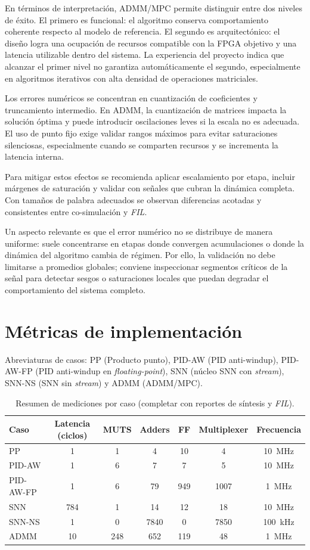 En términos de interpretación, ADMM/MPC permite distinguir entre dos niveles de éxito. El primero es funcional: el algoritmo conserva comportamiento coherente respecto al modelo de referencia. El segundo es arquitectónico: el diseño logra una ocupación de recursos compatible con la FPGA objetivo y una latencia utilizable dentro del sistema. La experiencia del proyecto indica que alcanzar el primer nivel no garantiza automáticamente el segundo, especialmente en algoritmos iterativos con alta densidad de operaciones matriciales.

Los errores numéricos se concentran en cuantización de coeficientes y truncamiento intermedio. En ADMM, la cuantización de matrices impacta la solución óptima y puede introducir oscilaciones leves si la escala no es adecuada. El uso de punto fijo exige validar rangos máximos para evitar saturaciones silenciosas, especialmente cuando se comparten recursos y se incrementa la latencia interna.

Para mitigar estos efectos se recomienda aplicar escalamiento por etapa, incluir márgenes de saturación y validar con señales que cubran la dinámica completa. Con tamaños de palabra adecuados se observan diferencias acotadas y consistentes entre co-simulación y \textit{FIL}.

Un aspecto relevante es que el error numérico no se distribuye de manera uniforme: suele concentrarse en etapas donde convergen acumulaciones o donde la dinámica del algoritmo cambia de régimen. Por ello, la validación no debe limitarse a promedios globales; conviene inspeccionar segmentos críticos de la señal para detectar sesgos o saturaciones locales que puedan degradar el comportamiento del sistema completo.

\section{Métricas de implementación}
Abreviaturas de casos: PP (Producto punto), PID-AW (PID anti-windup), PID-AW-FP (PID anti-windup en \textit{floating-point}), SNN (núcleo SNN con \textit{stream}), SNN-NS (SNN sin \textit{stream}) y ADMM (ADMM/MPC).

\begin{table}[H]
  \centering
  \caption{Resumen de mediciones por caso (completar con reportes de síntesis y \textit{FIL}).}
  \label{tab:tiempos}
  \begin{tabular}{lcccccc}
    \toprule
    Caso & Latencia (ciclos) & MUTS & Adders & FF & Multiplexer & Frecuencia \\
    \midrule
    PP & 1 & 1 & 4 & 10 & 4 & 10~MHz \\
    PID-AW & 1 & 6 & 7 & 7 & 5 & 10~MHz \\
    PID-AW-FP & 1 & 6 & 79 & 949 & 1007 & 1~MHz \\
    SNN & 784 & 1 & 14 & 12 & 18 & 10~MHz \\
    SNN-NS & 1 & 0 & 7840 & 0 & 7850 & 100~kHz \\
    ADMM & 10 & 248 & 652 & 119 & 48 & 1~MHz \\
    \bottomrule
  \end{tabular}
\end{table}

